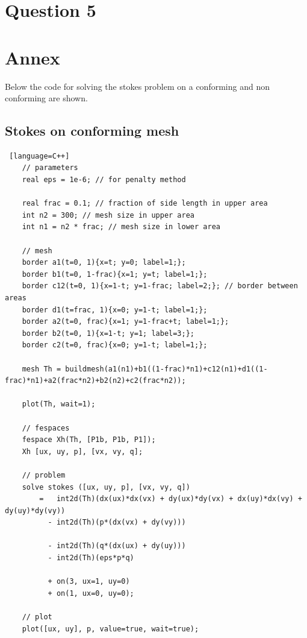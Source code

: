 \documentclass{article}
\begin{document}
\section*{Question 5}

\section*{Annex} \label{annex}
Below the code for solving the stokes problem on a conforming and non conforming are shown.

\subsection*{Stokes on conforming mesh}
\begin{lstlisting} [language=C++]
	// parameters
	real eps = 1e-6; // for penalty method 

	real frac = 0.1; // fraction of side length in upper area
	int n2 = 300; // mesh size in upper area
	int n1 = n2 * frac; // mesh size in lower area

	// mesh
	border a1(t=0, 1){x=t; y=0; label=1;};
	border b1(t=0, 1-frac){x=1; y=t; label=1;};
	border c12(t=0, 1){x=1-t; y=1-frac; label=2;}; // border between areas
	border d1(t=frac, 1){x=0; y=1-t; label=1;};
	border a2(t=0, frac){x=1; y=1-frac+t; label=1;};
	border b2(t=0, 1){x=1-t; y=1; label=3;};
	border c2(t=0, frac){x=0; y=1-t; label=1;};

	mesh Th = buildmesh(a1(n1)+b1((1-frac)*n1)+c12(n1)+d1((1-frac)*n1)+a2(frac*n2)+b2(n2)+c2(frac*n2));

	plot(Th, wait=1);

	// fespaces
	fespace Xh(Th, [P1b, P1b, P1]);
	Xh [ux, uy, p], [vx, vy, q];
 	 
	// problem
	solve stokes ([ux, uy, p], [vx, vy, q])
		=   int2d(Th)(dx(ux)*dx(vx) + dy(ux)*dy(vx) + dx(uy)*dx(vy) + dy(uy)*dy(vy))
	  	  - int2d(Th)(p*(dx(vx) + dy(vy)))

      	  - int2d(Th)(q*(dx(ux) + dy(uy)))
	  	  - int2d(Th)(eps*p*q)

	  	  + on(3, ux=1, uy=0)
      	  + on(1, ux=0, uy=0);

	// plot
	plot([ux, uy], p, value=true, wait=true);
\end{lstlisting}
\end{document}
